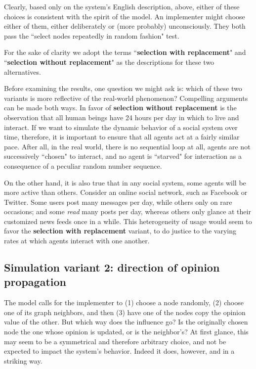 Clearly, based only on the system's English description, above, either of
these choices is consistent with the spirit of the model. An implementer might
choose either of them, either deliberately or (more probably) unconsciously.
They both pass the ``select nodes repeatedly in random fashion" test.

For the sake of clarity we adopt the terms ``\textbf{selection with
replacement}" and ``\textbf{selection without replacement}" as the
descriptions for these two alternatives.

Before examining the results, one question we might ask is: which of these two
variants is more reflective of the real-world phenomenon? Compelling arguments
can be made both ways. In favor of \textbf{selection without replacement} is
the observation that all human beings have 24 hours per day in which to live
and interact. If we want to simulate the dynamic behavior of a social system
over time, therefore, it is important to ensure that all agents act at a
fairly similar pace. After all, in the real world, there is no sequential loop
at all, agents are not successively ``chosen" to interact, and no agent is
``starved" for interaction as a consequence of a peculiar random number
sequence.

On the other hand, it is also true that in any social system, some agents will
be more active than others. Consider an online social network, such as
Facebook or Twitter. Some users post many messages per day, while others only
on rare occasions; and some \textit{read} many posts per day, whereas others
only glance at their customized news feeds once in a while. This heterogeneity
of usage would seem to favor the \textbf{selection with replacement} variant,
to do justice to the varying rates at which agents interact with one another.

\subsection{Simulation variant 2: direction of opinion propagation}

The model calls for the implementer to (1) choose a node randomly, (2) choose
one of its graph neighbors, and then (3) have one of the nodes copy the
opinion value of the other. But which way does the influence go? Is the
originally chosen node the one whose opinion is updated, or is the neighbor's?
At first glance, this may seem to be a symmetrical and therefore arbitrary
choice, and not be expected to impact the system's behavior. Indeed it does,
however, and in a striking way.

